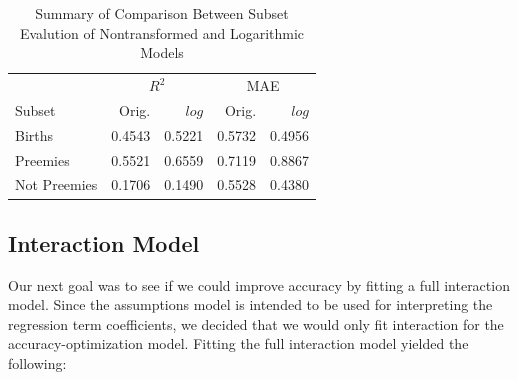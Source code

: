 \documentclass{article}\usepackage[]{graphicx}\usepackage[]{xcolor}
\begin{document}
\begin{table}[H]
\centering
\begin{tabular}{lrrrr}
  \hline
  &  \multicolumn{2}{c}{$R^2$} & \multicolumn{2}{c}{MAE}\\
  Subset & Orig. & $log$ & Orig. & $log$\\ 
  \hline
   Births & 0.4543 & 0.5221 & 0.5732 & 0.4956 \\ 
   Preemies & 0.5521 &  0.6559 & 0.7119 &  0.8867 \\ 
   Not Preemies & 0.1706 & 0.1490 & 0.5528& 0.4380 \\
   \hline
\end{tabular}
\caption{Summary of Comparison Between Subset Evalution of Nontransformed and Logarithmic Models}
\label{subset.comp}
\end{table}

\subsection{Interaction Model}

Our next goal was to see if we could improve accuracy by fitting a full interaction model. Since the assumptions model is intended to be used for interpreting the regression term coefficients, we decided that we would only fit interaction for the accuracy-optimization model. Fitting the full interaction model yielded the following: 
\end{document}
